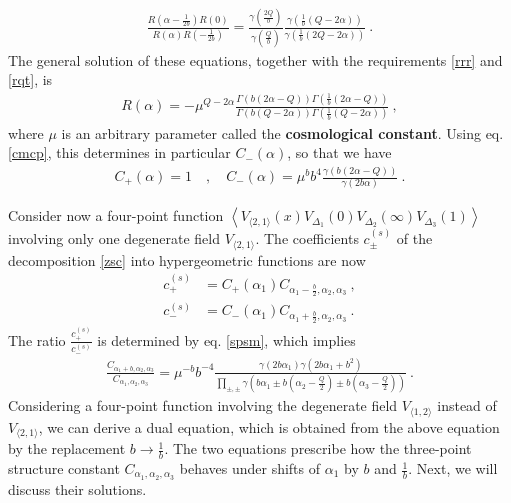 \documentclass[12pt,a4paper,notitlepage]{report}
\numberwithin{equation}{section}
\theoremstyle{break}
\begin{document}
\begin{align}
  \frac{R(\alpha-\tfrac{1}{2b})R(0)}{R(\alpha)R(-\tfrac{1}{2b})} = \frac{\gamma(\frac{2Q}{b})}{\gamma(\frac{Q}{b})} \frac{\gamma(\frac{1}{b}(Q-2\alpha))}{\gamma(\frac{1}{b}(2Q-2\alpha))}\ .
\end{align}
The general solution of these equations, together with the requirements \eqref{rrr} and \eqref{rqt}, is
\begin{align}
 \boxed{R(\alpha) = -\mu^{Q-2\alpha} \frac{\Gamma(b(2\alpha-Q))\Gamma(\frac{1}{b}(2\alpha-Q))}{\Gamma(b(Q-2\alpha))\Gamma(\frac{1}{b}(Q-2\alpha))}}\ ,
\label{ram}
\end{align}
where $\mu$ is an arbitrary parameter called the \textbf{\boldmath cosmological constant}.
Using eq. \eqref{cmcp}, this determines in particular $C_-(\alpha)$, so that we have
\begin{align}
 C_+(\alpha)=1 \quad , \quad C_-(\alpha) = \mu^b b^4 \frac{\gamma(b(2\alpha-Q))}{\gamma(2b\alpha)}\ .
\label{cpm}
\end{align}

Consider now a four-point function $\left\langle V_{\langle 2,1 \rangle}(x)V_{\Delta_1}(0)V_{\Delta_2}(\infty)V_{\Delta_3}(1)\right\rangle$ involving only one degenerate field $V_{\langle 2,1 \rangle}$.
The coefficients $c^{(s)}_\pm$ of the decomposition \eqref{zsc} into hypergeometric functions are now 
\begin{align}
 c_+^{(s)} & = C_+(\alpha_1) C_{\alpha_1-\frac{b}{2},\alpha_2,\alpha_3} \ ,
\\
c_-^{(s)} & = C_-(\alpha_1) C_{\alpha_1+\frac{b}{2},\alpha_2,\alpha_3}\ .
\end{align}
The ratio $\frac{c_+^{(s)}}{c_-^{(s)}}$ is determined by eq. \eqref{spsm}, which implies
\begin{align}
 \frac{C_{\alpha_1+b,\alpha_2,\alpha_3}}{C_{\alpha_1,\alpha_2,\alpha_3}} = \mu^{-b} b^{-4}\frac{\gamma(2b\alpha_1)\gamma(2b\alpha_1+b^2)}{\prod_{\pm,\pm} \gamma\left(b\alpha_1\pm b(\alpha_2-\frac{Q}{2})\pm b(\alpha_3-\frac{Q}{2})\right)}\ .
\label{fcc}
\end{align}
Considering a four-point function involving the degenerate field $V_{\langle 1,2 \rangle}$ instead of $V_{\langle 2,1 \rangle}$, we can derive a dual equation, which is obtained from the above equation by the replacement $b\rightarrow \frac{1}{b}$. 
The two equations prescribe how the three-point structure constant $C_{\alpha_1,\alpha_2,\alpha_3}$ behaves under shifts of $\alpha_1$ by $b$ and $\frac{1}{b}$.
Next, we will discuss their solutions.
\end{document}
